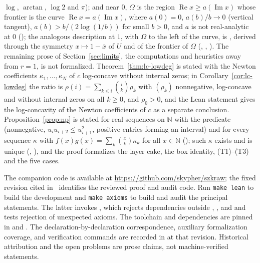 \documentclass[twoside,10pt]{article}
\numberwithin{equation}{section}
\theoremstyle{slbody}
\theoremstyle{definition}
\theoremstyle{remark}
\begin{document}
$\log$, $\arctan$, $\log2$ and $\pi$); and near $0$, $\Omega$ is the region $\operatorname{Re}x\geq a(\operatorname{Im}x)$ whose frontier is the curve $\operatorname{Re}x=a(\operatorname{Im}x)$, where $a(0)=0$, $a(b)/b\to0$ (vertical tangent), $a(b)>b/(2\log(1/b))$ for small $b>0$, and $a$ is not real-analytic at $0$ (); the analogous description at $1$, with $\Omega$ to the left of the curve, is , derived through the symmetry $x\mapsto1-\bar x$ of $U$ and of the frontier of $\Omega$ (, , ). The remaining prose of Section~\ref{sec:limits}, the computations and heuristics away from $r=1$, is not formalized. Theorem~\ref{thm:lc-lowdeg} is stated with the Newton coefficients $\kappa_1,\ldots,\kappa_N$ of $c$ log-concave without internal zeros; in Corollary~\ref{cor:lc-lowdeg} the ratio is $\rho(i)=\sum_{k\leq i}\binom ik\rho_k$ with $(\rho_k)$ nonnegative, log-concave and without internal zeros on all $k\geq0$, and $\rho_0>0$, and the Lean statement  gives the log-concavity of the Newton coefficients of $c$ as a separate conclusion. Proposition~\ref{prop:np} is stated for real sequences on $\mathbb N$ with the predicate  (nonnegative, $u_iu_{i+2}\leq u_{i+1}^2$, positive entries forming an interval) and for every sequence $\kappa$ with $f(x)g(x)=\sum_k\binom xk\kappa_k$ for all $x\in\mathbb N$ (); such $\kappa$ exists and is unique (, ), and the proof formalizes the layer cake, the box identity, (T1)--(T3) and the five cases.

The companion code is available at \url{https://github.com/skypher/szkraw}; the fixed revision cited in~\cite{code} identifies the reviewed proof and audit code. Run \verb|make lean| to build the development and \verb|make axioms| to build and audit the principal statements. The latter invokes , which rejects dependencies outside , , and  and tests rejection of unexpected axioms. The toolchain and dependencies are pinned in  and . The declaration-by-declaration correspondence, auxiliary formalization coverage, and verification commands are recorded in  at that revision. Historical attribution and the open problems are prose claims, not machine-verified statements.
\end{document}
